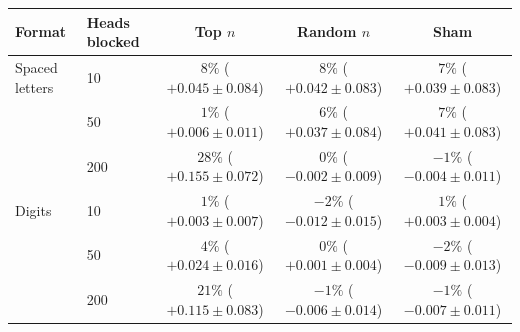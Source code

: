 \begin{tabular}{ll ccc}
\toprule
Format & Heads blocked & Top $n$ & Random $n$ & Sham \\
\midrule
Spaced letters & 10 & $8\%$ ($+0.045 \pm 0.084$) & $8\%$ ($+0.042 \pm 0.083$) & $7\%$ ($+0.039 \pm 0.083$) \\
 & 50 & $1\%$ ($+0.006 \pm 0.011$) & $6\%$ ($+0.037 \pm 0.084$) & $7\%$ ($+0.041 \pm 0.083$) \\
 & 200 & $28\%$ ($+0.155 \pm 0.072$) & $0\%$ ($-0.002 \pm 0.009$) & $-1\%$ ($-0.004 \pm 0.011$) \\
\midrule
Digits & 10 & $1\%$ ($+0.003 \pm 0.007$) & $-2\%$ ($-0.012 \pm 0.015$) & $1\%$ ($+0.003 \pm 0.004$) \\
 & 50 & $4\%$ ($+0.024 \pm 0.016$) & $0\%$ ($+0.001 \pm 0.004$) & $-2\%$ ($-0.009 \pm 0.013$) \\
 & 200 & $21\%$ ($+0.115 \pm 0.083$) & $-1\%$ ($-0.006 \pm 0.014$) & $-1\%$ ($-0.007 \pm 0.011$) \\
\bottomrule
\end{tabular}
